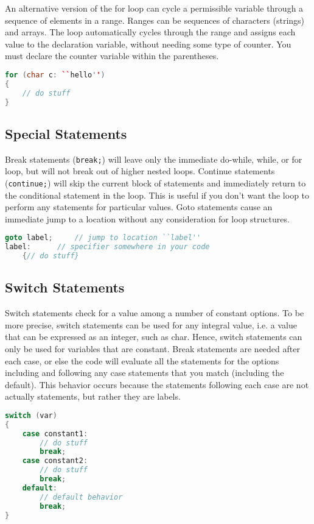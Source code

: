 \documentclass[10pt]{article}
\begin{document}
An alternative version of the for loop can cycle a permissible variable through a sequence of elements in a range. Ranges can be sequences of characters (strings) and arrays. The loop automatically cycles through the range and assigns each value to the declaration variable, without needing some type of counter. You must declare the counter variable within the parentheses.

\begin{lstlisting}[language=C++]
for (char c: ``hello'')
{
    // do stuff
}
\end{lstlisting}

\subsection{Special Statements}

Break statements (\texttt{break;}) will leave only the immediate do-while, while, or for loop, but will not break out of higher nested loops. Continue statements (\texttt{continue;}) will skip the current block of statements and immediately return to the conditional statement in the loop. This is useful if you don't want the loop to perform any statements for particular values. Goto statements cause an immediate jump to a location without any consideration for loop structures.

\begin{lstlisting}[language=C++]
goto label;		// jump to location ``label''
label:		// specifier somewhere in your code
    {// do stuff}
\end{lstlisting}

\subsection{Switch Statements}

Switch statements check for a value among a number of constant options. To be more precise, switch statements can be used for any integral value, i.e. a value that can be expressed as an integer, such as char. Hence, switch statements can only be used for variables that are constant. Break statements are needed after each case, or else the code will evaluate all the statements for the options including and following any case statements that you match (including the default). This behavior occurs because the statements following each case are not actually statements, but rather they are labels.

\begin{lstlisting}[language=C++]
switch (var)
{
    case constant1:
        // do stuff
        break;
    case constant2:
        // do stuff
        break;
    default:
        // default behavior
        break;
}
\end{lstlisting}
\end{document}
